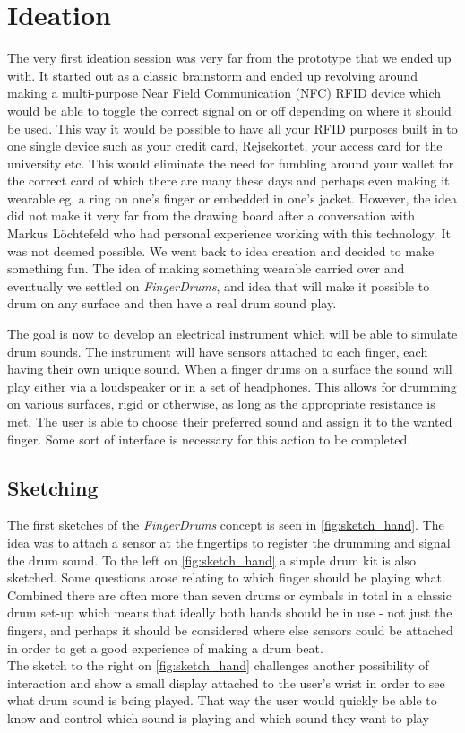 \chapter{Ideation}
\label{Ideation}
The very first ideation session was very far from the prototype that we ended up with. It started out as a classic brainstorm and ended up revolving around making a multi-purpose Near Field Communication (NFC) RFID device which would be able to toggle the correct signal on or off depending on where it should be used. This way it would be possible to have all your RFID purposes built in to one single device such as your credit card, Rejsekortet, your access card for the university etc. This would eliminate the need for fumbling around your wallet for the correct card of which there are many these days and perhaps even making it wearable eg. a ring on one's finger or embedded in one's jacket. However, the idea did not make it very far from the drawing board after a conversation with Markus Löchtefeld who had personal experience working with this technology. It was not deemed possible. We went back to idea creation and decided to make something fun. The idea of making something wearable carried over and eventually we settled on \textit{FingerDrums}, and idea that will make it possible to drum on any surface and then have a real drum sound play. 

The goal is now to develop an electrical instrument which will be able to simulate drum sounds. The instrument will have sensors attached to each finger, each having their own unique sound. When a finger drums on a surface the sound will play either via a loudspeaker or in a set of headphones. This allows for drumming on various surfaces, rigid or otherwise, as long as the appropriate resistance is met. The user is able to choose their preferred sound and assign it to the wanted finger. Some sort of interface is necessary for this action to be completed.



\section{Sketching}
The first sketches of the \textit{FingerDrums} concept is seen in \autoref{fig:sketch_hand}. The idea was to attach a sensor at the fingertips to register the drumming and signal the drum sound. To the left on \autoref{fig:sketch_hand} a simple drum kit is also  sketched. Some questions arose relating to which finger should be playing what. Combined there are often more than seven drums or cymbals in total in a classic drum set-up which means that ideally both hands should be in use - not just the fingers, and perhaps it should be considered where else sensors could be attached in order to get a good experience of making a drum beat.\\
The sketch to the right on \autoref{fig:sketch_hand} challenges another possibility of interaction and show a small display attached to the user's wrist in order to see what drum sound is being played. That way the user would quickly be able to know and control which sound is playing and which sound they want to play


